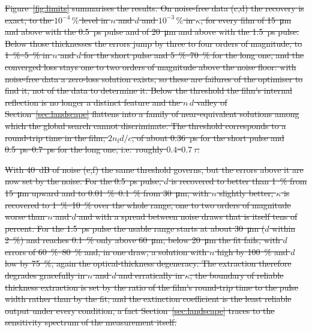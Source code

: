 \documentclass{optica-article}
\DeclareRobustCommand{\del}[1]{{\color{red}\sout{#1}}}
\newcommand{\kap}{\kappa}
\begin{document}
\del{Figure~\mbox{\ref{fig:limits}} summarises the results. On noise-free data (c,d) the recovery is exact, to the $10^{-4}\,\%$ level in $n$ and $d$ and $10^{-3}\,\%$ in $\kap$, for every film of \mbox{\SI{15}{\micro\metre}} and above with the \mbox{\SI{0.5}{\pico\second}} pulse and of \mbox{\SI{20}{\micro\metre}} and above with the \mbox{\SI{1.5}{\pico\second}} pulse. Below those thicknesses the errors jump by three to four orders of magnitude, to \mbox{\SIrange{1}{5}{\percent}} in $n$ and $d$ for the short pulse and \mbox{\SIrange{5}{70}{\percent}} for the long one, and the converged loss stays one to two orders of magnitude above the noise floor: with noise-free data a zero-loss solution exists, so these are failures of the optimiser to find it, not of the data to determine it. Below the threshold the film's internal reflection is no longer a distinct feature and the $n\,d$ valley of Section~\mbox{\ref{sec:landscape}} flattens into a family of near-equivalent solutions among which the global search cannot discriminate. The threshold corresponds to a round-trip time in the film, $2n_{\mathrm f}d/c$, of about \mbox{\SI{0.36}{\pico\second}} for the short pulse and \mbox{\SIrange{0.5}{0.7}{\pico\second}} for the long one, i.e.\ roughly $0.4$--$0.7\,\tau$.}

\del{With \mbox{\SI{40}{dB}} of noise (e,f) the same threshold governs, but the errors above it are now set by the noise. For the \mbox{\SI{0.5}{\pico\second}} pulse, $d$ is recovered to better than \mbox{\SI{1}{\percent}} from \mbox{\SI{15}{\micro\metre}} upward and to \mbox{\SIrange{0.01}{0.1}{\percent}} from \mbox{\SI{30}{\micro\metre}}, with $n$ slightly better; $\kap$ is recovered to \mbox{\SIrange{1}{10}{\percent}} over the whole range, one to two orders of magnitude worse than $n$ and $d$ and with a spread between noise draws that is itself tens of percent. For the \mbox{\SI{1.5}{\pico\second}} pulse the usable range starts at about \mbox{\SI{30}{\micro\metre}} ($d$ within \mbox{\SI{2}{\percent}}) and reaches \mbox{\SI{0.1}{\percent}} only above \mbox{\SI{60}{\micro\metre}}; below \mbox{\SI{20}{\micro\metre}} the fit fails, with $d$ errors of \mbox{\SIrange{60}{80}{\percent}} and, in one draw, a solution with $n$ high by \mbox{\SI{100}{\percent}} and $d$ low by \mbox{\SI{75}{\percent}}, again the optical-thickness degeneracy. The extraction therefore degrades gracefully in $n$ and $d$ and erratically in $\kap$; the boundary of reliable thickness extraction is set by the ratio of the film's round-trip time to the pulse width rather than by the fit; and the extinction coefficient is the least reliable output under every condition, a fact Section~\mbox{\ref{sec:landscape}} traces to the sensitivity spectrum of the measurement itself.}
\end{document}
